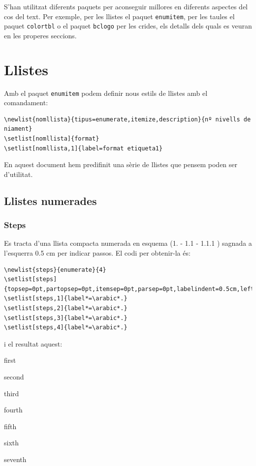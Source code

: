 \documentclass[a4paper,
                             twoside,
                             BCOR1.0cm,
                             DIV11,
                             parskip=full,
                             11pt]{scrbook}
\begin{document}
S'han utilitzat diferents paquets per aconseguir millores en diferents aspectes del cos del text. Per exemple, per les llistes el paquet \verb+enumitem+, per les taules el paquet \verb+colortbl+ o el paquet \verb+bclogo+ per les crides,  els detalls dels quals es veuran en les properes seccions.

\section{Llistes}\label{sec:llistes}
Amb el paquet \verb+enumitem+ podem definir nous estils de llistes amb el comandament:
\begin{tiny}
\begin{verbatim}
\newlist{nomllista}{tipus=enumerate,itemize,description}{nº nivells de niament} 
\setlist[nomllista]{format}
\setlist[nomllista,1]{label=format etiqueta1}
\end{verbatim}
\end{tiny}

En aquest document hem predifinit una sèrie de llistes que pensem poden ser d'utilitat.

\subsection{Llistes numerades}\label{sbsec:llistnum}
\subsubsection{Steps}\label{ssbsec:steps}
Es tracta d'una llista compacta numerada en esquema (1. - 1.1 - 1.1.1 ) sagnada a l'esquerra 0.5 cm per indicar passos. El codi per obtenir-la és:
\begin{tiny}
\begin{verbatim}
\newlist{steps}{enumerate}{4}
\setlist[steps]{topsep=0pt,partopsep=0pt,itemsep=0pt,parsep=0pt,labelindent=0.5cm,leftmargin=*}
\setlist[steps,1]{label*=\arabic*.}
\setlist[steps,2]{label*=\arabic*.}
\setlist[steps,3]{label*=\arabic*.}
\setlist[steps,4]{label*=\arabic*.}
\end{verbatim}
\end{tiny}
i el resultat aquest:
\begin{steps}
\item first
\item second
\item third
\item fourth
\item fifth
\item sixth
\item seventh
\end{steps}
\end{document}
